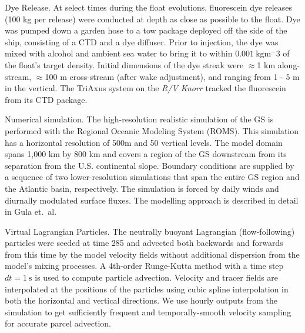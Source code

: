 \documentclass{natureJMK}
\begin{document}
Dye Release. At select times during the float evolutions, fluorescein dye releases (100 kg per release) were conducted at depth as close as possible to the float.  Dye was pumped down a garden hose to a tow package deployed off the side of the ship, consisting of a CTD and a dye diffuser.  Prior to injection, the dye was mixed with alcohol and ambient sea water to bring it to within $0.001\ \mathrm{kg m^-3}$ of the float's target density. Initial dimensions of the dye streak were $\approx$1 km along-stream, $\approx$100 m cross-stream (after wake adjustment), and ranging from 1 - 5 m in the vertical. The TriAxus system on the \emph{R/V Knorr} tracked the fluorescein from its CTD package.  

Numerical simulation. The high-resolution realistic simulation of the GS is performed with the Regional Oceanic Modeling System (ROMS\cite{shchepetkinmcwilliams05}). This simulation has a horizontal resolution of 500m and 50 vertical levels. The model domain spans 1,000 km by 800 km and covers a region of the GS downstream from its separation from the U.S. continental slope. Boundary conditions are supplied by a sequence of two lower-resolution simulations that span the entire GS region and the Atlantic basin, respectively. The simulation is forced by daily winds and diurnally modulated surface fluxes. The modelling approach is described in detail in Gula et.\ al\cite{gulaetal15}.

Virtual Lagrangian Particles.  The neutrally buoyant Lagrangian (flow-following) particles were seeded at time 285 and advected both backwards and forwards from this time by the model velocity fields without  additional dispersion from the model's mixing processes\cite{gulaetal14}. A 4th-order Runge-Kutta method with a  time step  $dt = 1\ \mathrm{s}$ is used to compute particle advection. Velocity and tracer fields are interpolated at the positions of the particles using cubic spline interpolation in both the horizontal and vertical directions.  We use hourly outputs from the simulation to get sufficiently frequent and temporally-smooth velocity sampling for accurate parcel advection.






\end{document}
